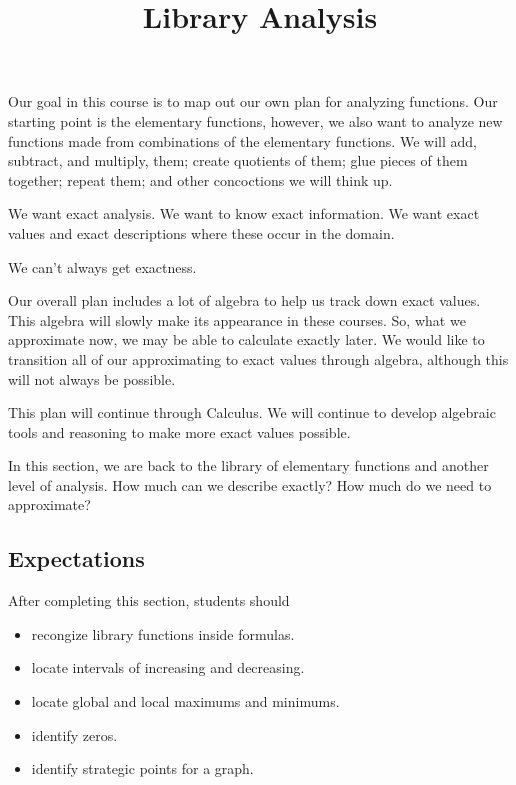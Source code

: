 \documentclass{ximera}
\title{Library Analysis}
\begin{document}
\begin{abstract}
\end{abstract}
\maketitle


Our goal in this course is to map out our own plan for analyzing functions.  Our starting point is the elementary functions, however, we also want to analyze new functions made from combinations of the elementary functions.  We will add, subtract, and multiply, them; create quotients of them; glue pieces of them together; repeat them; and other concoctions we will think up.

We want exact analysis.  We want to know exact information.  We want exact values and exact descriptions where these occur in the domain.

We can't always get exactness. 

Our overall plan includes a lot of algebra to help us track down exact values.  This algebra will slowly make its appearance in these courses.  So, what we approximate now, we may be able to calculate exactly later.  We would like to transition all of our approximating to exact values through algebra, although this will not always be possible.

This plan will continue through Calculus.  We will continue to develop algebraic tools and reasoning to make more exact values possible.

In this section, we are back to the library of elementary functions and another level of analysis.  How much can we describe exactly? How much do we need to approximate?




\subsection{Expectations}

\begin{sectionOutcomes}
After completing this section, students should 

\begin{itemize}
\item recongize library functions inside formulas.
\item locate intervals of increasing and decreasing.
\item locate global and local maximums and minimums.
\item identify zeros.
\item identify strategic points for a graph.
\end{itemize}
\end{sectionOutcomes}
\end{document}
